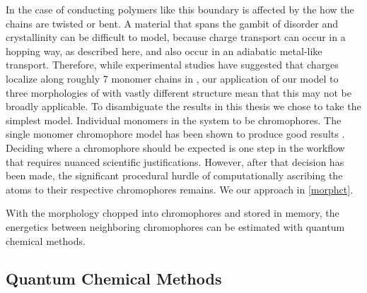 In the case of conducting polymers like  this boundary is affected by the how the chains are twisted
or bent. A material that spans the gambit of disorder and crystallinity can be difficult to model, because
charge transport can occur in a hopping way, as described here, and also occur in an adiabatic metal-like transport. 
Therefore, while experimental studies have suggested that charges localize along roughly 7 monomer chains
in , our application of our model to three morphologies of  with vastly different structure mean 
that this may not be broadly applicable. To disambiguate the results in this thesis we chose to take the
simplest model. Individual monomers in the system to be chromophores. The single monomer chromophore model has been shown to
produce good results \cite{Jones2017}.
Deciding where a chromophore should be expected is one step in the workflow that requires nuanced
scientific justifications. However, after that decision has been made, the significant procedural hurdle of 
computationally ascribing the atoms to their respective chromophores remains.
We our approach in \autoref{morphct}.

With the morphology chopped into chromophores and stored in memory, the energetics between
neighboring chromophores can be estimated with quantum chemical methods.

\subsection{Quantum Chemical Methods}
\label{qccmethods}

